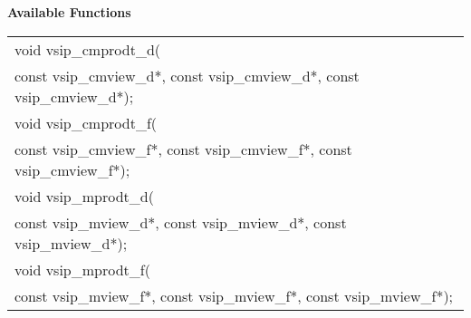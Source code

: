 \\\cvsiplh
\\ \hspace*{.8cm} \vspace*{.1cm} \textbf{Available Functions }
\\ \hspace*{0.03\textwidth} {
\ttfamily
\begin{tabular}[H]{l}
void vsip\_cmprodt\_d(\\*\hspace{.6cm}
    const vsip\_cmview\_d*, const vsip\_cmview\_d*, const vsip\_cmview\_d*);\\
void vsip\_cmprodt\_f(\\*\hspace{.6cm}
    const vsip\_cmview\_f*, const vsip\_cmview\_f*, const vsip\_cmview\_f*);\\
void vsip\_mprodt\_d(\\*\hspace{.6cm}
    const vsip\_mview\_d*, const vsip\_mview\_d*, const vsip\_mview\_d*);\\
void vsip\_mprodt\_f(\\*\hspace{.6cm}
    const vsip\_mview\_f*, const vsip\_mview\_f*, const vsip\_mview\_f*);\\
\end{tabular}
}
\\\pyjvsiph
{}
